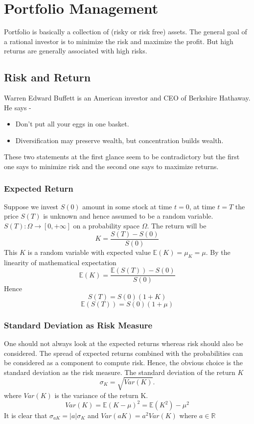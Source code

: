 \chapter{Portfolio Management}
Portfolio is basically a collection of (risky or risk free) assets. The general goal of a rational investor is to minimize the risk and maximize the profit. But high returns are generally associated with high risks.
\section{Risk and Return}
Warren Edward Buffett is an American investor and CEO of Berkshire Hathaway. He says -
\begin{itemize}
    \item Don't put all your eggs in one basket.
    \item Diversification may preserve wealth, but concentration builds wealth.
\end{itemize}
These two statements at the first glance seem to be contradictory but the first one says to minimize risk and the second one says to maximize returns.
\subsection{Expected Return}
 Suppose we invest $S(0)$ amount in some stock at time $t=0$, at time $t=T$ the price $S(T)$ is unknown and hence assumed to be a random variable. $S(T) : \Omega \rightarrow [0,+\infty]$ on a probability space $\Omega$.
 The return will be
 \begin{equation}
     K = \frac{S(T)-S(0)}{S(0)}
 \end{equation}
 This $K$ is a random variable with expected value $\mathbb{E}(K)=\mu_{K}=\mu$.
 By the linearity of mathematical expectation 
\begin{equation}
    \mathbb{E}(K)=\frac{\mathbb{E}(S(T))-S(0)}{S(0)}
\end{equation}
Hence $$S(T)=S(0)(1+K)$$ $$\mathbb{E}(S(T))=S(0)(1+\mu)$$
\subsection{Standard Deviation as Risk Measure}
One should not always look at the expected returns whereas risk should also be considered. The spread of expected returns combined with the probabilities can be considered as a component to compute risk. Hence, the obvious choice is the standard deviation as the risk measure. The standard deviation of the return $K$
$$\sigma_{K} = \sqrt{Var(K)}.$$
where $Var(K)$ is the variance of the return K.
$$Var(K)=\mathbb{E}(K-\mu)^{2}=\mathbb{E}(K^{2})-\mu^{2}$$
It is clear that $\sigma_{aK}= \lvert a \rvert \sigma_{K}$ and $Var(aK)=a^{2}Var(K)$ where $a \in \mathbb{R}$
